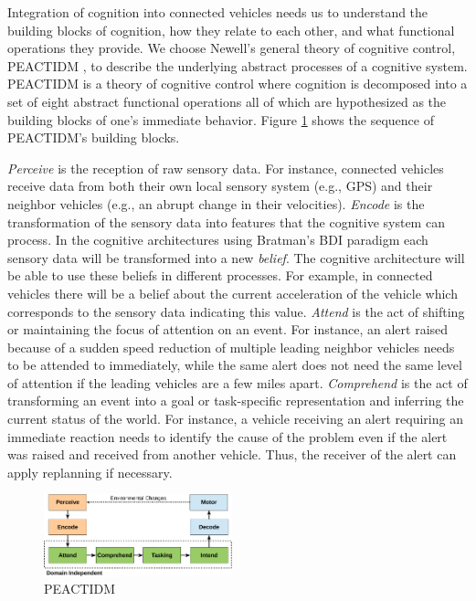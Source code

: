\documentclass[journal, 11pt]{IEEEtran}
\begin{document}
Integration of cognition into connected vehicles needs us to understand the
building blocks of cognition, how they relate to each other, and what
functional operations they provide. We choose Newell's general theory of
cognitive control, PEACTIDM \cite{newell:unified-cognition}, to describe the
underlying abstract processes of a cognitive system. PEACTIDM is a theory of
cognitive control where cognition is decomposed into a set of eight abstract
functional operations \cite{newell:unified-cognition} all of which are
hypothesized as the building blocks of one's immediate behavior. Figure
\ref{fig:peactidm} shows the sequence of PEACTIDM's building blocks.

\textit{Perceive} is the reception of raw sensory data. For instance, connected
vehicles receive data from both their own local sensory system (e.g., GPS) and
their neighbor vehicles (e.g., an abrupt change in their velocities).
\textit{Encode} is the transformation of the sensory data into features that the
cognitive system can process. In the cognitive architectures using Bratman's BDI
paradigm \cite{bratman:intentions-plans} each sensory data will be transformed
into a new \textit{belief}. The cognitive architecture will be able to use these
beliefs in different processes. For example, in connected vehicles there will be
a belief about the current acceleration of the vehicle which corresponds to the
sensory data indicating this value. \textit{Attend} is the act of shifting or
maintaining the focus of attention on an event. For instance, an alert raised
because of a sudden speed reduction of multiple leading neighbor vehicles needs
to be attended to immediately, while the same alert does not need the same level
of attention if the leading vehicles are a few miles apart. \textit{Comprehend} is
the act of transforming an event into a goal or task-specific representation and
inferring the current status of the world. For instance, a vehicle receiving an
alert requiring an immediate reaction needs to identify the cause of the problem
even if the alert was raised and received from another vehicle. Thus, the
receiver of the alert can apply replanning if necessary.

\begin{figure}[!t]
  \centering
  \includegraphics[width=0.485\textwidth]{figs/peactidm-croped.pdf}
  \caption{{\fontsize{10}{10}\selectfont PEACTIDM}}
  \label{fig:peactidm}
  \vspace*{-6mm}
\end{figure}
\end{document}

